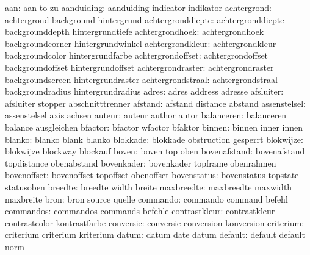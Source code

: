                  aan:  aan                  to                   zu
          aanduiding:  aanduiding           indicator            indikator
         achtergrond:  achtergrond          background           hintergrund
   achtergronddiepte:  achtergronddiepte    backgrounddepth      hintergrundtiefe
     achtergrondhoek:  achtergrondhoek      backgroundcorner     hintergrundwinkel
    achtergrondkleur:  achtergrondkleur     backgroundcolor      hintergrundfarbe
   achtergrondoffset:  achtergrondoffset    backgroundoffset     hintergrundoffset
   achtergrondraster:  achtergrondraster    backgroundscreen     hintergrundraster
   achtergrondstraal:  achtergrondstraal    backgroundradius     hintergrundradius
               adres:  adres                address              adresse
           afsluiter:  afsluiter            stopper              abschnitttrenner
             afstand:  afstand              distance             abstand
        assenstelsel:  assenstelsel         axis                 achsen
              auteur:  auteur               author               autor
          balanceren:  balanceren           balance              ausgleichen
             bfactor:  bfactor              wfactor              bfaktor
              binnen:  binnen               inner                innen
              blanko:  blanko               blank                blanko
            blokkade:  blokkade             obstruction          gesperrt
           blokwijze:  blokwijze            blockway             blockauf
               boven:  boven                top                  oben
        bovenafstand:  bovenafstand         topdistance          obenabstand
          bovenkader:  bovenkader           topframe             obenrahmen
         bovenoffset:  bovenoffset          topoffset            obenoffset
         bovenstatus:  bovenstatus          topstate             statusoben
             breedte:  breedte              width                breite
          maxbreedte:  maxbreedte           maxwidth             maxbreite
                bron:  bron                 source               quelle
            commando:  commando             command              befehl
           commandos:  commandos            commands             befehle
       contrastkleur:  contrastkleur        contrastcolor        kontrastfarbe
           conversie:  conversie            conversion           konversion
           criterium:  criterium            criterium            kriterium
               datum:  datum                date                 datum
             default:  default              default              norm
